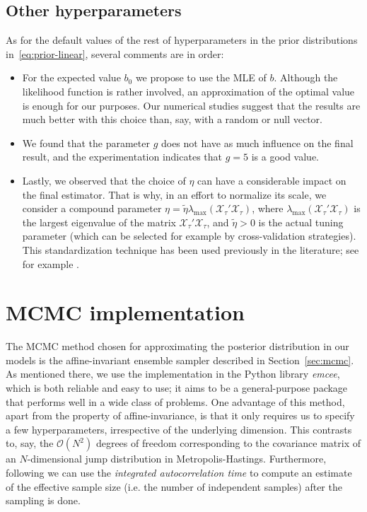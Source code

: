 \subsection*{Other hyperparameters}

As for the default values of the rest of hyperparameters in the prior distributions in~\eqref{eq:prior-linear}, several comments are in order:
\begin{itemize}
  \item For the expected value \(b_0\) we propose to use the MLE of \(b\). Although the likelihood function is rather involved, an approximation of the optimal value is enough for our purposes. Our numerical studies suggest that the results are much better with this choice than, say, with a random or null vector.
  \item We found that the parameter \(g\) does not have as much influence on the final result, and the experimentation indicates that \(g=5\) is a good value.
  \item Lastly, we observed that the choice of \(\eta\) can have a considerable impact on the final estimator. That is why, in an effort to normalize its scale, we consider a compound parameter \(\eta = \tilde \eta \lambda_{\max}(\mathcal X_\tau'\mathcal X_\tau)\), where \(\lambda_{\max}(\mathcal X_\tau'\mathcal X_\tau)\) is the largest eigenvalue of the matrix \(\mathcal X_\tau'\mathcal X_\tau\), and \(\tilde\eta > 0\) is the actual tuning parameter (which can be selected for example by cross-validation strategies). This standardization technique has been used previously in the literature; see for example \citet{grollemund2019bayesian}.
\end{itemize}

\section{MCMC implementation}

The MCMC method chosen for approximating the posterior distribution in our models is the affine-invariant ensemble sampler described in Section~\ref{sec:mcmc}. As mentioned there, we use the implementation in the Python library \textit{emcee}, which is both reliable and easy to use; it aims to be a general-purpose package that performs well in a wide class of problems. One advantage of this method, apart from the property of affine-invariance, is that it only requires us to specify a few hyperparameters, irrespective of the underlying dimension. This contrasts to, say, the \(\mathcal O(N^2)\) degrees of freedom corresponding to the covariance matrix of an \(N\)-dimensional jump distribution in Metropolis-Hastings.
Furthermore, following \citet{goodman2010ensemble} we can use the \textit{integrated autocorrelation time} to compute an estimate of the effective sample size (i.e. the number of independent samples) after the sampling is done.

